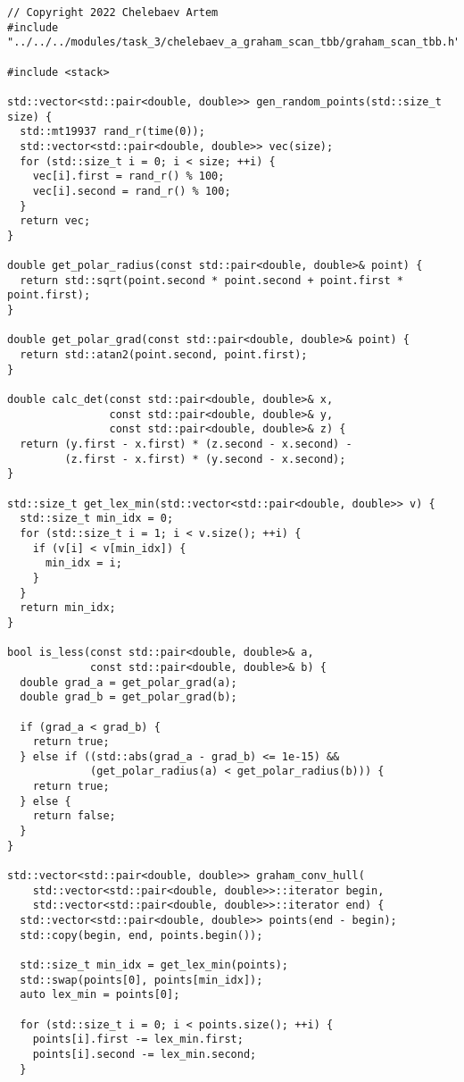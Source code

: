 \documentclass{report}
\begin{document}
\begin{lstlisting}
// Copyright 2022 Chelebaev Artem
#include "../../../modules/task_3/chelebaev_a_graham_scan_tbb/graham_scan_tbb.h"

#include <stack>

std::vector<std::pair<double, double>> gen_random_points(std::size_t size) {
  std::mt19937 rand_r(time(0));
  std::vector<std::pair<double, double>> vec(size);
  for (std::size_t i = 0; i < size; ++i) {
    vec[i].first = rand_r() % 100;
    vec[i].second = rand_r() % 100;
  }
  return vec;
}

double get_polar_radius(const std::pair<double, double>& point) {
  return std::sqrt(point.second * point.second + point.first * point.first);
}

double get_polar_grad(const std::pair<double, double>& point) {
  return std::atan2(point.second, point.first);
}

double calc_det(const std::pair<double, double>& x,
                const std::pair<double, double>& y,
                const std::pair<double, double>& z) {
  return (y.first - x.first) * (z.second - x.second) -
         (z.first - x.first) * (y.second - x.second);
}

std::size_t get_lex_min(std::vector<std::pair<double, double>> v) {
  std::size_t min_idx = 0;
  for (std::size_t i = 1; i < v.size(); ++i) {
    if (v[i] < v[min_idx]) {
      min_idx = i;
    }
  }
  return min_idx;
}

bool is_less(const std::pair<double, double>& a,
             const std::pair<double, double>& b) {
  double grad_a = get_polar_grad(a);
  double grad_b = get_polar_grad(b);

  if (grad_a < grad_b) {
    return true;
  } else if ((std::abs(grad_a - grad_b) <= 1e-15) &&
             (get_polar_radius(a) < get_polar_radius(b))) {
    return true;
  } else {
    return false;
  }
}

std::vector<std::pair<double, double>> graham_conv_hull(
    std::vector<std::pair<double, double>>::iterator begin,
    std::vector<std::pair<double, double>>::iterator end) {
  std::vector<std::pair<double, double>> points(end - begin);
  std::copy(begin, end, points.begin());

  std::size_t min_idx = get_lex_min(points);
  std::swap(points[0], points[min_idx]);
  auto lex_min = points[0];

  for (std::size_t i = 0; i < points.size(); ++i) {
    points[i].first -= lex_min.first;
    points[i].second -= lex_min.second;
  }


\end{lstlisting}
\end{document}
